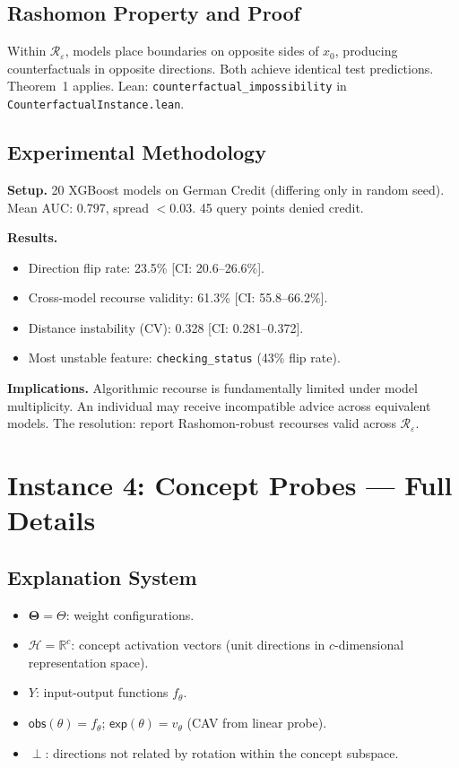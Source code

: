 \documentclass{article}
\newcommand{\R}{\mathbb{R}}
\newcommand{\Params}{\mathbf{\Theta}}
\newcommand{\sH}{\mathcal{H}}
\newcommand{\incomp}{\perp}
\begin{document}
\subsection{Rashomon Property and Proof}

Within $\mathcal{R}_\varepsilon$, models place boundaries on opposite sides of $x_0$, producing counterfactuals in opposite directions.  Both achieve identical test predictions.  Theorem~1 applies.  Lean: \texttt{counterfactual\_impossibility} in \texttt{CounterfactualInstance.lean}.

\subsection{Experimental Methodology}

\textbf{Setup.}  20 XGBoost models on German Credit (differing only in random seed).  Mean AUC: 0.797, spread $< 0.03$.  45 query points denied credit.

\textbf{Results.}
\begin{itemize}
  \item Direction flip rate: 23.5\% [CI: 20.6--26.6\%].
  \item Cross-model recourse validity: 61.3\% [CI: 55.8--66.2\%].
  \item Distance instability (CV): 0.328 [CI: 0.281--0.372].
  \item Most unstable feature: \texttt{checking\_status} (43\% flip rate).
\end{itemize}

\textbf{Implications.}  Algorithmic recourse is fundamentally limited under model multiplicity.  An individual may receive incompatible advice across equivalent models.  The resolution: report Rashomon-robust recourses valid across $\mathcal{R}_\varepsilon$.

\section{Instance 4: Concept Probes --- Full Details}
\label{sec:concept-full}

\subsection{Explanation System}

\begin{itemize}
  \item $\Params = \Theta$: weight configurations.
  \item $\sH = \R^c$: concept activation vectors (unit directions in $c$-dimensional representation space).
  \item $Y$: input-output functions $f_\theta$.
  \item $\mathsf{obs}(\theta) = f_\theta$; $\mathsf{exp}(\theta) = v_\theta$ (CAV from linear probe).
  \item $\incomp$: directions not related by rotation within the concept subspace.
\end{itemize}
\end{document}
